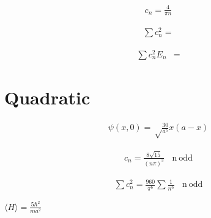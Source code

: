 \documentclass{article}
\newcommand{\<}{\langle}
\renewcommand{\>}{\rangle}
\begin{document}
\begin{align*}
c_n = \frac{4}{\pi n}
\end{align*}

\begin{align*}
\sum c_n^2 = 
\end{align*}

\begin{align*}
\sum c_n^2 E_n &=
\end{align*}


\section{Quadratic}

\begin{align*}
\psi(x,0) = \sqrt\frac{30}{a^5}x(a-x)
\end{align*}

\begin{align*}
c_n = \frac{8\sqrt{15}}{(n\pi)^3}\ \ \ \  \mathrm{n\ odd}
\end{align*}

\begin{align*}
\sum c_n^2 = \frac{960}{\pi^6}\sum\frac{1}{n^6}\ \ \ \  \mathrm{n\ odd}
\end{align*}

$\<H\> = \frac{5\hbar^2}{ma^2}$
\end{document}
